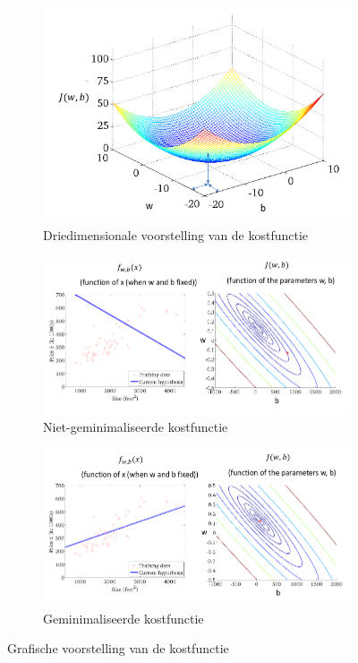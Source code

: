 \begin{figure}[h]
	\centering
	\begin{subfigure}{.5\textwidth}
		\centering
		\includegraphics[width=\textwidth]{images/4-cost-function-3d.png}
		\caption{Driedimensionale voorstelling van de kostfunctie}
		\label{fig:cost-function-3d}
	\end{subfigure}
	\begin{subfigure}{.5\textwidth}
		\centering
		\includegraphics[width=\textwidth]{images/5-cost-function-not-min.png}
		\caption{Niet-geminimaliseerde kostfunctie}
		\label{fig:cost-function-not-min}
	\end{subfigure}
	\begin{subfigure}{.5\textwidth}
		\centering
		\includegraphics[width=\textwidth]{images/6-cost-function-min.png}
		\caption{Geminimaliseerde kostfunctie}
		\label{fig:cost-function-min}
	\end{subfigure}
	\caption{Grafische voorstelling van de kostfunctie}
	\label{fig:cost-function}
\end{figure}
\newpage

